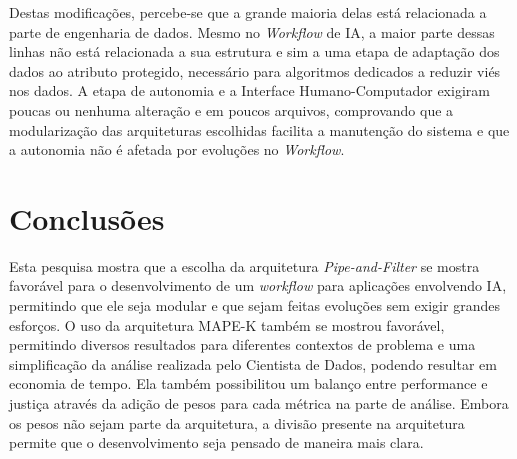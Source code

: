 \documentclass[posterIC]{a0poster}
\begin{document}
\begin{multicols}{2}
\begin{center}
\label{tbl:ManutencaoPipelineDataset}
\end{center}

Destas modificações, percebe-se que a grande maioria delas está relacionada a parte de engenharia de dados. Mesmo no \textit{Workflow} de IA, a maior parte dessas linhas não está relacionada a sua estrutura e sim a uma etapa de adaptação dos dados ao atributo protegido, necessário para algoritmos dedicados a reduzir viés nos dados. A etapa de autonomia e a Interface Humano-Computador exigiram poucas ou nenhuma alteração e em poucos arquivos, comprovando que a modularização das arquiteturas escolhidas facilita a manutenção do sistema e que a autonomia não é afetada por evoluções no \textit{Workflow}.

\section{Conclusões}

Esta pesquisa mostra que a escolha da arquitetura \textit{Pipe-and-Filter} se mostra favorável para o desenvolvimento de um \textit{workflow} para aplicações envolvendo IA, permitindo que ele seja modular e que sejam feitas evoluções sem exigir grandes esforços. O uso da arquitetura MAPE-K também se mostrou favorável, permitindo diversos resultados para diferentes contextos de problema e uma simplificação da análise realizada pelo Cientista de Dados, podendo resultar em economia de tempo. Ela também possibilitou um balanço entre performance e justiça através da adição de pesos para cada métrica na parte de análise. Embora os pesos não sejam parte da arquitetura, a divisão presente na arquitetura permite que o desenvolvimento seja pensado de maneira mais clara.


\end{multicols}
\end{document}
